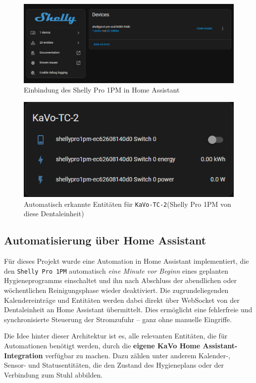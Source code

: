 \begin{figure}[H]
  \centering
  \includegraphics[width=1\linewidth]{images/ha_shelly}
  \caption{Einbindung des Shelly Pro 1PM in Home Assistant}
\end{figure}

\begin{figure}[H]
  \centering
  \includegraphics[width=0.65\linewidth]{images/ha_shelly_2.png}
  \caption{Automatisch erkannte Entitäten für \texttt{KaVo-TC-2}(Shelly Pro 1PM von diese Dentaleinheit)}
\end{figure}

\subsection{Automatisierung über Home Assistant}

Für dieses Projekt wurde eine Automation in Home Assistant implementiert, die den \texttt{Shelly Pro 1PM} automatisch \emph{eine Minute vor Beginn} eines geplanten Hygieneprogramms einschaltet und ihn nach Abschluss der abendlichen oder wöchentlichen Reinigungsphase wieder deaktiviert. Die zugrundeliegenden Kalendereinträge und Entitäten werden dabei direkt über WebSocket von der Dentaleinheit an Home Assistant übermittelt. Dies ermöglicht eine fehlerfreie und synchronisierte Steuerung der Stromzufuhr – ganz ohne manuelle Eingriffe.

Die Idee hinter dieser Architektur ist es, alle relevanten Entitäten, die für Automationen benötigt werden, durch die \textbf{eigene KaVo Home Assistant-Integration} verfügbar zu machen. Dazu zählen unter anderem Kalender-, Sensor- und Statusentitäten, die den Zustand des Hygieneplans oder der Verbindung zum Stuhl abbilden.


